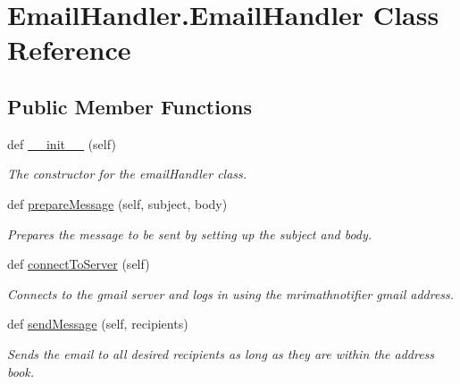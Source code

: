 \hypertarget{classEmailHandler_1_1EmailHandler}{}\section{Email\+Handler.\+Email\+Handler Class Reference}
\label{classEmailHandler_1_1EmailHandler}
\subsection*{Public Member Functions}
\begin{DoxyCompactItemize}
\item 
def \mbox{\hyperlink{classEmailHandler_1_1EmailHandler_ac820eeb8d982e9e9eb3ef60fbe25a4ac}{\+\_\+\+\_\+init\+\_\+\+\_\+}} (self)
\begin{DoxyCompactList}\small\item\em The constructor for the email\+Handler class. \end{DoxyCompactList}\item 
def \mbox{\hyperlink{classEmailHandler_1_1EmailHandler_a738e27838ff55ce3ad5264b55f927570}{prepare\+Message}} (self, subject, body)
\begin{DoxyCompactList}\small\item\em Prepares the message to be sent by setting up the subject and body. \end{DoxyCompactList}\item 
\mbox{\label{classEmailHandler_1_1EmailHandler_a61a47776f4572f351e8f3ee4a95c476c}} 
def \mbox{\hyperlink{classEmailHandler_1_1EmailHandler_a61a47776f4572f351e8f3ee4a95c476c}{connect\+To\+Server}} (self)
\begin{DoxyCompactList}\small\item\em Connects to the gmail server and logs in using the mrimathnotifier gmail address. \end{DoxyCompactList}\item 
def \mbox{\hyperlink{classEmailHandler_1_1EmailHandler_a54db017e0c03dbf296b537f46ac181e6}{send\+Message}} (self, recipients)
\begin{DoxyCompactList}\small\item\em Sends the email to all desired recipients as long as they are within the address book. \end{DoxyCompactList}\item 
\mbox{\label{classEmailHandler_1_1EmailHandler_a66b5b3161b6b60f049e8163fbe2e3f59}} 

\end{DoxyCompactItemize}
